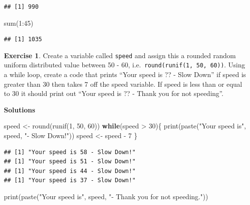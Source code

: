 \documentclass[
]{book}
\newenvironment{Shaded}{\begin{snugshade}}{\end{snugshade}}
\newcommand{\ControlFlowTok}[1]{\textcolor[rgb]{0.13,0.29,0.53}{\textbf{#1}}}
\newcommand{\DecValTok}[1]{\textcolor[rgb]{0.00,0.00,0.81}{#1}}
\newcommand{\FunctionTok}[1]{\textcolor[rgb]{0.00,0.00,0.00}{#1}}
\newcommand{\NormalTok}[1]{#1}
\newcommand{\OtherTok}[1]{\textcolor[rgb]{0.56,0.35,0.01}{#1}}
\newcommand{\SpecialCharTok}[1]{\textcolor[rgb]{0.00,0.00,0.00}{#1}}
\newcommand{\StringTok}[1]{\textcolor[rgb]{0.31,0.60,0.02}{#1}}
\theoremstyle{definition}
\theoremstyle{definition}
\theoremstyle{definition}
\newtheorem{exercise}{Exercise}[chapter]
\theoremstyle{definition}
\theoremstyle{remark}
\begin{document}
\begin{verbatim}
## [1] 990
\end{verbatim}

\begin{Shaded}
\begin{Highlighting}[]
\FunctionTok{sum}\NormalTok{(}\DecValTok{1}\SpecialCharTok{:}\DecValTok{45}\NormalTok{)}
\end{Highlighting}
\end{Shaded}

\begin{verbatim}
## [1] 1035
\end{verbatim}

\begin{exercise}
Create a variable called \texttt{speed} and assign this a rounded random uniform distributed value between 50 - 60, i.e.~\texttt{round(runif(1,\ 50,\ 60))}. Using a while loop, create a code that prints ``Your speed is ?? - Slow Down'' if speed is greater than 30 then takes 7 off the speed variable. If speed is less than or equal to 30 it should print out ``Your speed is ?? - Thank you for not speeding''.
\end{exercise}

\textbf{Solutions}

\begin{Shaded}
\begin{Highlighting}[]
\NormalTok{speed }\OtherTok{\textless{}{-}} \FunctionTok{round}\NormalTok{(}\FunctionTok{runif}\NormalTok{(}\DecValTok{1}\NormalTok{, }\DecValTok{50}\NormalTok{, }\DecValTok{60}\NormalTok{))}
\ControlFlowTok{while}\NormalTok{(speed }\SpecialCharTok{\textgreater{}} \DecValTok{30}\NormalTok{)\{}
  \FunctionTok{print}\NormalTok{(}\FunctionTok{paste}\NormalTok{(}\StringTok{"Your speed is"}\NormalTok{, speed, }\StringTok{"{-} Slow Down!"}\NormalTok{))}
\NormalTok{  speed }\OtherTok{\textless{}{-}}\NormalTok{ speed }\SpecialCharTok{{-}} \DecValTok{7}
\NormalTok{\}}
\end{Highlighting}
\end{Shaded}

\begin{verbatim}
## [1] "Your speed is 58 - Slow Down!"
## [1] "Your speed is 51 - Slow Down!"
## [1] "Your speed is 44 - Slow Down!"
## [1] "Your speed is 37 - Slow Down!"
\end{verbatim}

\begin{Shaded}
\begin{Highlighting}[]
\FunctionTok{print}\NormalTok{(}\FunctionTok{paste}\NormalTok{(}\StringTok{"Your speed is"}\NormalTok{, speed, }\StringTok{"{-} Thank you for not speeding."}\NormalTok{))}
\end{Highlighting}
\end{Shaded}
\end{document}
